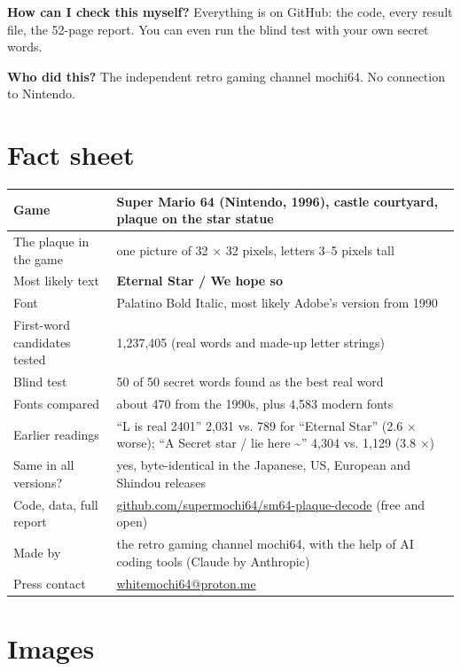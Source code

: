 \documentclass[11pt,a4paper]{article}
\begin{document}
\textbf{How can I check this myself?} Everything is on GitHub: the code, every result file, the 52-page report. You can even run the blind test with your own secret words.

\textbf{Who did this?} The independent retro gaming channel mochi64. No connection to Nintendo.

\section*{Fact sheet}

\begin{longtable}{p{4.6cm}p{11.4cm}}\toprule
Game & Super Mario 64 (Nintendo, 1996), castle courtyard, plaque on the star statue\\\midrule
The plaque in the game & one picture of 32 $\times$ 32 pixels, letters 3–5 pixels tall\\
Most likely text & \textbf{Eternal Star / We hope so}\\
Font & Palatino Bold Italic, most likely Adobe's version from 1990\\
First-word candidates tested & 1,237,405 (real words and made-up letter strings)\\
Blind test & 50 of 50 secret words found as the best real word\\
Fonts compared & about 470 from the 1990s, plus 4,583 modern fonts\\
Earlier readings & ``L is real 2401'' 2,031 vs. 789 for ``Eternal Star'' (2.6 $\times$ worse); ``A Secret star / lie here \textasciitilde{}'' 4,304 vs. 1,129 (3.8 $\times$)\\
Same in all versions? & yes, byte-identical in the Japanese, US, European and Shindou releases\\
Code, data, full report & \href{https://github.com/supermochi64/sm64-plaque-decode}{github.com/supermochi64/sm64-plaque-decode} (free and open)\\
Made by & the retro gaming channel mochi64, with the help of AI coding tools (Claude by Anthropic)\\
Press contact & \href{https://github.com/supermochi64/sm64-plaque-decode/blob/main/press/mailto:whitemochi64@proton.me}{whitemochi64@proton.me}\\
\bottomrule\end{longtable}
\section*{Images}
\end{document}
